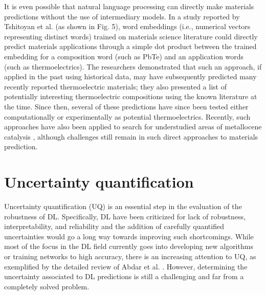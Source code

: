 \documentclass[pdflatex,sn-mathphys]{sn-jnl}%
\theoremstyle{thmstyleone}%
\theoremstyle{thmstyletwo}%
\theoremstyle{thmstylethree}%
\begin{document}
It is even possible that natural language processing can directly make materials predictions without the use of intermediary models. In a study reported by Tshitoyan et al. \cite{tshitoyan2019unsupervised} (as shown in Fig. 5), word embeddings (i.e., numerical vectors representing distinct words) trained on materials science literature could directly predict materials applications through a simple dot product between the trained embedding for a composition word (such as PbTe) and an application words (such as thermoelectrics). The researchers demonstrated that such an approach, if applied in the past using historical data, may have subsequently predicted many recently reported thermoelectric materials; they also presented a list of potentially interesting thermoelectric compositions using the known literature at the time. Since then, several of these predictions have since been tested either computationally \cite{yang2018low,wang2019ultralow,jong2020manifestation,yamamoto2020first,viennois2020anisotropic,haque2020effect} or experimentally\cite{yahyaoglu2021phase} as potential thermoelectrics. Recently, such approaches have also been applied to search for understudied areas of metallocene catalysis \cite{ho2020using}, although challenges still remain in such direct approaches to materials prediction.

\section{Uncertainty quantification}\label{sec:uncertainty}


Uncertainty quantification (UQ) is an essential step in the evaluation of the robustness of DL. Specifically, DL have been criticized for lack of robustness, interpretability, and reliability and the addition of carefully quantified uncertainties would go a long way towards improving such shortcomings. While most of the focus in the DL field currently goes into developing new algorithms or training networks to high accuracy, there is an increasing attention to UQ, as exemplified by the detailed review of Abdar et al. \cite{abdar2021review}. However, determining the uncertainty associated to DL predictions is still a challenging and far from a completely solved problem. 
\end{document}
